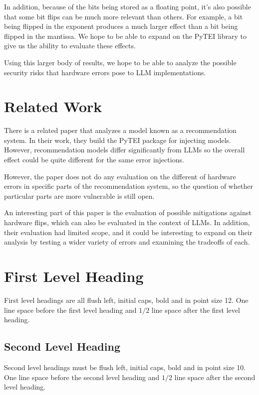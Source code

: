 \documentclass[a4paper]{article}
\begin{document}
In addition, because of the bits being stored as a floating point, it's also possible that some bit flips can be much more relevant than others. For example, a bit being flipped in the exponent produces a much larger effect than a bit being flipped in the mantissa. We hope to be able to expand on the PyTEI library to give us the ability to evaluate these effects.

Using this larger body of results, we hope to be able to analyze the possible security risks that hardware errors pose to LLM implementations.

\section{Related Work}
There is a related paper \cite{Ma23} that analyzes a model known as a recommendation system. In their work, they build the PyTEI package for injecting models. However, recommendation models differ significantly from LLMs so the overall effect could be quite different for the same error injections.

However, the paper does not do any evaluation on the different of hardware errors in specific parts of the recommendation system, so the question of whether particular parts are more vulnerable is still open.

An interesting part of this paper is the evaluation of possible mitigations against hardware flips, which can also be evaluated in the context of LLMs. In addition, their evaluation had limited scope, and it could be interesting to expand on their analysis by testing a wider variety of errors and examining the tradeoffs of each.

\section{First Level Heading}

First level headings are all flush left, initial caps, bold and in point
size 12. One line space before the first level heading and $1/2$ line
space after the first level heading.

\subsection{Second Level Heading}

Second level headings must be flush left, initial caps, bold and in point
size 10. One line space before the second level heading and $1/2$ line
space after the second level heading.
\end{document}
